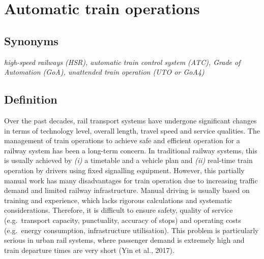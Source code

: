 \documentclass[
]{book}
\begin{document}
\hypertarget{automatic_train}{%
\section{Automatic train operations}\label{automatic_train}}

\hypertarget{synonyms-37}{%
\subsection*{Synonyms}\label{synonyms-37}}

\emph{high-speed railways (HSR), automatic train control system (ATC), Grade of Automation (GoA), unattended train operation (UTO or GoA4)}

\hypertarget{definition-40}{%
\subsection*{Definition}\label{definition-40}}

Over the past decades, rail transport systems have undergone significant changes in terms of technology level, overall length, travel speed and service qualities. The management of train operations to achieve safe and efficient operation for a railway system has been a long-term concern. In traditional railway systems, this is usually achieved by \emph{(i)} a timetable and a vehicle plan and \emph{(ii)} real-time train operation by drivers using fixed signalling equipment. However, this partially manual work has many disadvantages for train operation due to increasing traffic demand and limited railway infrastructure. Manual driving is usually based on training and experience, which lacks rigorous calculations and systematic considerations. Therefore, it is difficult to ensure safety, quality of service (e.g.~transport capacity, punctuality, accuracy of stops) and operating costs (e.g.~energy consumption, infrastructure utilisation). This problem is particularly serious in urban rail systems, where passenger demand is extremely high and train departure times are very short (Yin et al., 2017).
\end{document}
